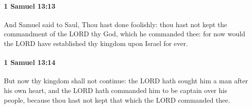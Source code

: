 		\paragraph{1 Samuel 13:13} %
			\label{1SAMUEL-13-13}

			And Samuel said to Saul, Thou hast done foolishly: thou hast not kept the commandment of the LORD thy God, which he commanded thee: for now would the LORD have established thy kingdom upon Israel for ever.


		\paragraph{1 Samuel 13:14} %
			\label{1SAMUEL-13-14}

			But now thy kingdom shall not continue: the LORD hath sought him a man after his own heart, and the LORD hath commanded him to be captain over his people, because thou hast not kept that which the LORD commanded thee.

